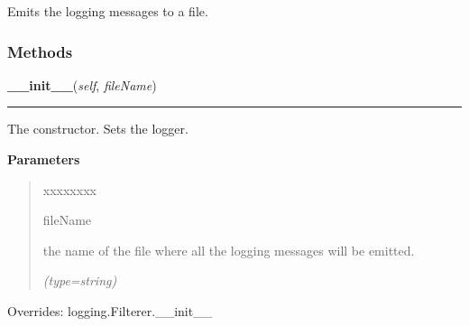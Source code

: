 Emits the logging messages to a file.



  \subsubsection{Methods}

    \vspace{0.5ex}

\hspace{.8\funcindent}\begin{boxedminipage}{\funcwidth}

    \raggedright \textbf{\_\_init\_\_}(\textit{self}, \textit{fileName})

    \vspace{-1.5ex}

    \rule{\textwidth}{0.5\fboxrule}
\setlength{\parskip}{2ex}
    The constructor. Sets the logger.

\setlength{\parskip}{1ex}
      \textbf{Parameters}
      \vspace{-1ex}

      \begin{quote}
        \begin{Ventry}{xxxxxxxx}

          \item[fileName]

          the name of the file where all the logging messages will be 
          emitted.

            {\it (type=string)}

        \end{Ventry}

      \end{quote}

      Overrides: logging.Filterer.\_\_init\_\_

    \end{boxedminipage}

    \vspace{0.5ex}

